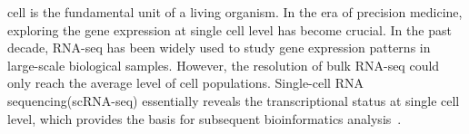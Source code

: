 \documentclass[10pt,journal,compsoc]{IEEEtran}
\begin{document}
%
\IEEEpeerreviewmaketitle



% 
% 
% 
% 


 cell is the fundamental unit of a living organism. In the era of precision medicine, exploring the gene expression at single cell level has become crucial. In the past decade, RNA-seq has been widely used to study gene expression patterns in large-scale biological samples. However, the resolution of bulk RNA-seq could only reach the average level of cell populations. Single-cell RNA sequencing(scRNA-seq) essentially reveals the transcriptional status at single cell level, which provides the basis for subsequent bioinformatics analysis~\cite{Papalexi2018SinglecellRS}. 
\end{document}
